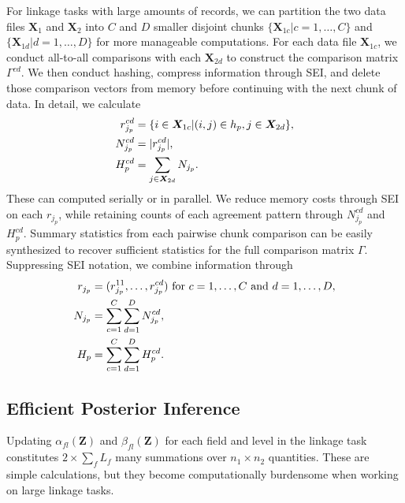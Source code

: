 \documentclass[ba]{imsart}
\begin{document}
For linkage tasks with large amounts of records, we can partition the two data files \(\bm{X}_1\) and \(\bm{X}_2\) into $C$ and $D$ smaller disjoint chunks $\{\bm{X}_{1c} | c = 1, \ldots, C \}$ and $\{\bm{X}_{1d} | d = 1, \ldots, D \}$ for more manageable computations. For each data file $\bm{X}_{1c}$, we conduct all-to-all comparisons with each $\bm{X}_{2d}$ to construct the comparison matrix $\Gamma^{cd}$. We then conduct hashing, compress information through SEI, and delete those comparison vectors from memory before continuing with the next chunk of data. In detail, we calculate
\begin{subequations}
	\begin{align}
		r_{j_p}^{cd} &= \{i \in \bm{X}_{1c} | (i, j) \in h_p, j \in \bm{X}_{2d}\}, \label{r_{j_p}^{cd}} \\
		N_{j_p}^{cd} &= |r_{j_p}^{cd}|, \label{N_{j_p}^{cd}} \\
		H_p^{cd} &= \sum_{j \in \bm{X}_{2d}} N_{j_p}.\label{H_p^{cd}}
	\end{align}
\end{subequations}
These can computed serially or in parallel. We reduce memory costs through SEI on each $r_{j_p}$, while retaining counts of each agreement pattern through $N_{j_p}^{cd}$ and $H_p^{cd}$. Summary statistics from each pairwise chunk comparison can be easily synthesized to recover sufficient statistics for the full comparison matrix $\Gamma$. Suppressing SEI notation, we combine information through
\begin{subequations}
	\begin{align}
		r_{j_p} &= (r_{j_p}^{11}, \ldots, r_{j_p}^{cd}) \text{ for } c = 1, \ldots, C \text{ and } d = 1, \ldots, D,\label{r_{j_p}} \\
		N_{j_p} &= \sum_{c = 1}^C \sum_{d = 1}^D N_{j_p}^{cd},\label{N_{j_p}} \\
		H_p &= \sum_{c = 1}^C \sum_{d = 1}^D H_p^{cd}.\label{H_p}
	\end{align}
\end{subequations}

\hypertarget{efficient-posterior}{%
	\subsection{Efficient Posterior Inference }\label{efficient-posterior}}

Updating  \(\alpha_{fl}(\bm{Z})\) and \(\beta_{fl}(\bm{Z})\) for each field and level in the linkage task constitutes \(2 \times \sum_f L_f\) many summations over \(n_1 \times n_2\) quantities. These are simple calculations, but they become computationally burdensome when working on large linkage tasks. 
\end{document}

